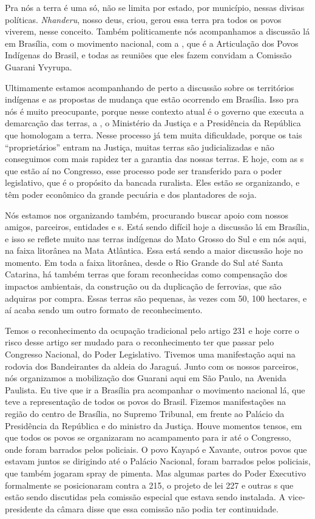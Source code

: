 Pra nós a terra é uma só, não se limita por estado, por município,
nessas divisas políticas. \emph{Nhanderu}, nosso deus, criou, gerou essa terra
pra todos os povos viverem, nesse conceito. Também politicamente nós
acompanhamos a discussão lá em Brasília, com o movimento nacional, com
a , que é a Articulação dos Povos Indígenas do Brasil, e todas as
reuniões que eles fazem convidam a Comissão Guarani Yvyrupa.

Ultimamente estamos acompanhando de perto a discussão sobre os
territórios indígenas e as propostas de mudança que estão ocorrendo em
Brasília. Isso pra nós é muito preocupante, porque nesse contexto atual
é o governo que executa a demarcação das terras, a , o Ministério
da Justiça e a Presidência da República que homologam a terra. Nesse
processo já tem muita dificuldade, porque os tais ``proprietários''
entram na Justiça, muitas terras são judicializadas e não conseguimos
com mais rapidez ter a garantia das nossas terras. E hoje, com as s
que estão aí no Congresso, esse processo pode ser transferido para o
poder legislativo, que é o propósito da bancada ruralista. Eles estão
se organizando, e têm poder econômico da grande pecuária e dos
plantadores de soja. 

Nós estamos nos organizando também, procurando buscar apoio com nossos
amigos, parceiros, entidades e s. Está sendo difícil hoje a
discussão lá em Brasília, e isso se reflete muito nas terras indígenas
do Mato Grosso do Sul e em nós aqui, na faixa litorânea na Mata Atlântica.
Essa está sendo a maior discussão hoje no momento. Em toda a faixa
litorânea, desde o Rio Grande do Sul até Santa Catarina, há também
terras que foram reconhecidas como compensação dos impactos ambientais,
da construção ou da duplicação de ferrovias, que são adquiras por
compra. Essas terras são pequenas, às vezes com 50, 100 hectares, e aí
acaba sendo um outro formato de reconhecimento.

Temos o reconhecimento da ocupação tradicional pelo artigo 231 e hoje
corre o risco desse artigo ser mudado para o reconhecimento ter que
passar pelo Congresso Nacional, do Poder Legislativo. Tivemos uma
manifestação aqui na rodovia dos Bandeirantes da aldeia do Jaraguá.
Junto com os nossos parceiros, nós organizamos a mobilização dos
Guarani aqui em São Paulo, na Avenida Paulista. Eu tive que ir a
Brasília pra acompanhar o movimento nacional lá, que teve a
representação de todos os povos do Brasil. Fizemos manifestações na
região do centro de Brasília, no Supremo Tribunal, em frente ao Palácio
da Presidência da República e do ministro da Justiça. Houve momentos
tensos, em que todos os povos se organizaram no acampamento para ir até
o Congresso, onde foram barrados pelos policiais. O povo Kayapó e
Xavante, outros povos que estavam juntos se dirigindo até o Palácio
Nacional, foram barrados pelos policiais, que também jogaram spray de
pimenta. Mas algumas partes do Poder Executivo formalmente se
posicionaram contra a  215, o projeto de lei 227 e outras s que
estão sendo discutidas pela comissão especial que estava sendo
instalada. A vice-presidente da câmara disse que essa comissão não
podia ter continuidade.

